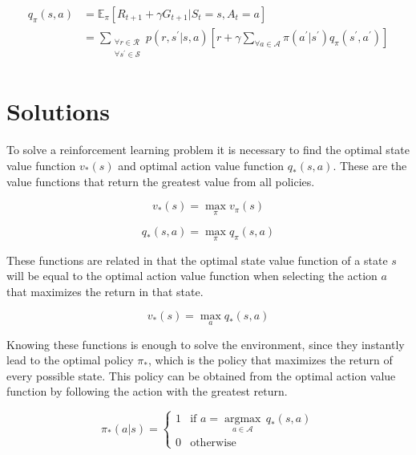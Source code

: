 \begin{align}
\begin{split}
    \label{eq:bellman_action}
    q_\pi(s,a) &= \mathbb{E}_\pi[R_{t+1} + \gamma G_{t+1}|S_t = s, A_t = a] \\
    &= \sum_{\substack{\forall r \in \mathcal{R} \\ \forall s^\prime \in \mathcal{S}}}{p(r,s^\prime|s,a)[r + \gamma \sum_{\forall a \in \mathcal{A}}{\pi(a^\prime|s^\prime)q_\pi(s^\prime,a^\prime)}]}
\end{split}
\end{align}

\section{Solutions}

To solve a reinforcement learning problem it is necessary to find the optimal state value function $v_\ast(s)$ and optimal action value function $q_\ast(s,a)$. These are the value functions that return the greatest value from all policies.

\begin{equation}
    v_\ast(s) = \max_{\pi}{v_\pi(s)}
\end{equation}

\begin{equation}
    q_\ast(s,a) = \max_{\pi}{q_\pi(s,a)}
\end{equation}

These functions are related in that the optimal state value function of a state $s$ will be equal to the optimal action value function when selecting the action $a$ that maximizes the return in that state.

\begin{equation}
    v_\ast(s) = \max_{a}{q_\ast(s,a)}
\end{equation}

Knowing these functions is enough to solve the environment, since they instantly lead to the optimal policy $\pi_\ast$, which is the policy that maximizes the return of every possible state. This policy can be obtained from the optimal action value function by following the action with the greatest return.

\begin{equation}
    \pi_\ast(a|s) = 
    \begin{cases}
        1 &\textrm{if $a = \underset{a \in \mathcal{A}}{\operatorname{argmax}}$}\,q_\ast(s,a)\\
        0 &\textrm{otherwise}
    \end{cases}
\end{equation}

